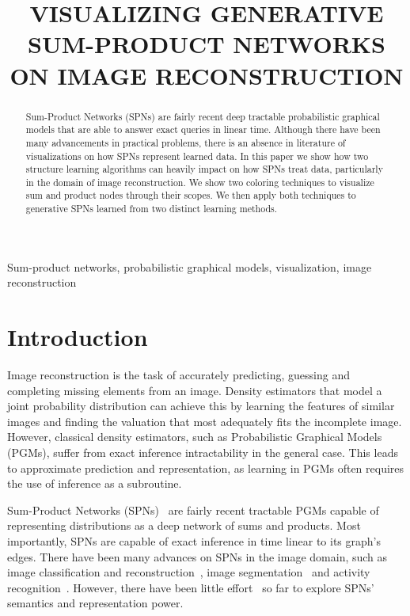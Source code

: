 \documentclass{article}
\title{VISUALIZING GENERATIVE SUM-PRODUCT NETWORKS ON IMAGE RECONSTRUCTION}
\begin{document}
%
\maketitle
%
\begin{abstract}
  Sum-Product Networks (SPNs) are fairly recent deep tractable probabilistic graphical models that
  are able to answer exact queries in linear time. Although there have been many advancements in
  practical problems, there is an absence in literature of visualizations on how SPNs represent
  learned data. In this paper we show how two structure learning algorithms can heavily impact on
  how SPNs treat data, particularly in the domain of image reconstruction. We show two coloring
  techniques to visualize sum and product nodes through their scopes. We then apply both techniques
  to generative SPNs learned from two distinct learning methods.
\end{abstract}
%
\begin{keywords}
Sum-product networks, probabilistic graphical models, visualization, image reconstruction
\end{keywords}
%
\section{Introduction}
\label{sec:intro}

Image reconstruction is the task of accurately predicting, guessing and completing missing elements
from an image. Density estimators that model a joint probability distribution can achieve this by
learning the features of similar images and finding the valuation that most adequately fits the
incomplete image. However, classical density estimators, such as Probabilistic Graphical Models
(PGMs), suffer from exact inference intractability in the general case. This leads to approximate
prediction and representation, as learning in PGMs often requires the use of inference as a
subroutine.

Sum-Product Networks (SPNs)~\cite{poon11} are fairly recent tractable PGMs capable of representing
distributions as a deep network of sums and products. Most importantly, SPNs are capable of exact
inference in time linear to its graph's edges. There have been many advances on SPNs in the image
domain, such as image classification and reconstruction~\cite{gens13,dennis12,gens12}, image
segmentation~\cite{yuan16} and activity recognition~\cite{amer12,amer16,wang18}. However, there
have been little effort~\cite{vergari16} so far to explore SPNs' semantics and representation
power.
\end{document}
